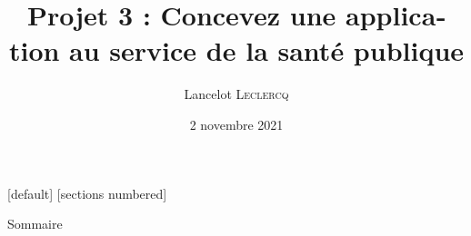 
\usepackage{fontspec}
	\setmainfont{TeX Gyre Heros}
\usepackage{unicode-math}
\usepackage{lualatex-math}
\usepackage{polyglossia}
\setdefaultlanguage[frenchpart=false]{french}
\usepackage{microtype}
\usepackage[locale = FR,
            separate-uncertainty,
            multi-part-units = single,
            range-units = single]{siunitx}
	\DeclareSIUnit{}
\usepackage{amsmath}
\usepackage{amsfonts}
\usepackage{amssymb}
\usepackage{array}
\usepackage{graphicx}
\graphicspath{{./Figures/}}
\usepackage{booktabs}
\usepackage{tabularx}
\usepackage{multirow}
\usepackage{multicol}
\usepackage{tikz}
\usetikzlibrary{mindmap}
\usetikzlibrary{overlay-beamer-styles}
\usepackage{subcaption}
\usepackage[]{animate}
\usepackage{float}
\usepackage{csquotes}

[default]
[sections numbered]

\title[Concevez une application au service de la santé publique]{Projet 3 : Concevez une application au service de la santé publique}
\author[Lancelot \textsc{Leclercq}]{Lancelot \textsc{Leclercq}} 
\institute[]{}
\date[]{\small{2 novembre 2021}}



\begin{frame}[plain]
  \titlepage
\end{frame}

\begin{frame}{Sommaire}
  \Large
  \begin{columns}
    \begin{column}{.7\textwidth}
      \tableofcontents[hideallsubsections]
    \end{column}
  \end{columns}
\end{frame}

